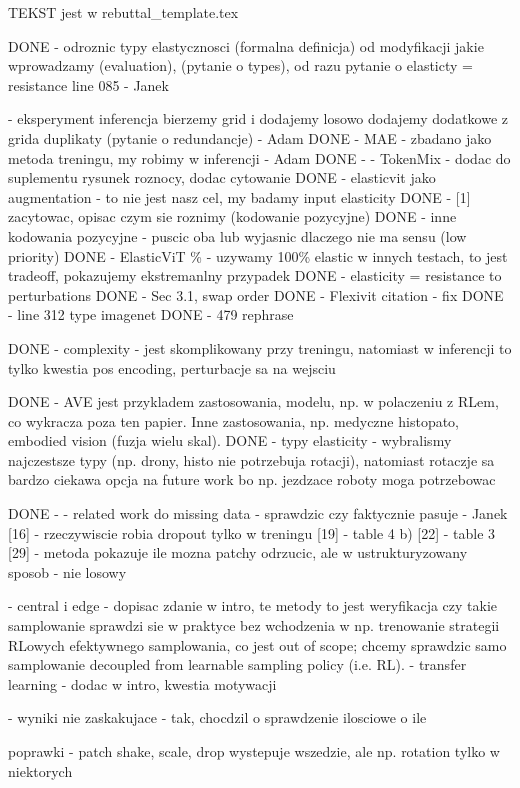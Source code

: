 TEKST jest w rebuttal\_template.tex


DONE - odroznic typy elastycznosci (formalna definicja) od modyfikacji jakie wprowadzamy (evaluation), (pytanie o types), od razu pytanie o elasticty = resistance line 085 - Janek




- eksperyment inferencja bierzemy grid i dodajemy losowo dodajemy dodatkowe z grida duplikaty (pytanie o redundancje) - Adam
DONE - MAE - zbadano jako metoda treningu, my robimy w inferencji - Adam
DONE - - TokenMix - dodac do suplementu rysunek roznocy, dodac cytowanie
DONE - elasticvit jako augmentation - to nie jest nasz cel, my badamy input elasticity
DONE - [1] zacytowac, opisac czym sie roznimy (kodowanie pozycyjne)
DONE - inne kodowania pozycyjne - puscic oba lub wyjasnic dlaczego nie ma sensu (low priority)
DONE - ElasticViT \% - uzywamy 100\% elastic w innych testach, to jest tradeoff, pokazujemy ekstremanlny przypadek
DONE - elasticity = resistance to perturbations
DONE - Sec 3.1, swap order
DONE - Flexivit citation - fix
DONE - line 312 type imagenet
DONE - 479 rephrase



DONE - complexity - jest skomplikowany przy treningu, natomiast w inferencji to tylko kwestia pos encoding, perturbacje sa na wejsciu


DONE - AVE jest przykladem zastosowania, modelu, np. w polaczeniu z RLem, co wykracza poza ten papier. Inne zastosowania, np. medyczne histopato, embodied vision (fuzja wielu skal).
DONE - typy elasticity - wybralismy najczestsze typy (np. drony, histo nie potrzebuja rotacji), natomiast rotaczje sa bardzo ciekawa opcja na future work bo np. jezdzace roboty moga potrzebowac

DONE - - related work do missing data - sprawdzic czy faktycznie pasuje - Janek
[16] - rzeczywiscie robia dropout tylko w treningu
[19] - table 4 b)
[22] - table 3
[29] - metoda pokazuje ile mozna patchy odrzucic, ale w ustrukturyzowany sposob - nie losowy


- central i edge - dopisac zdanie w intro, te metody to jest weryfikacja czy takie samplowanie sprawdzi sie w praktyce bez wchodzenia w np. trenowanie strategii RLowych efektywnego samplowania, co jest out of scope; chcemy sprawdzic samo samplowanie decoupled from learnable sampling policy (i.e. RL).
- transfer learning - dodac w intro, kwestia motywacji


- wyniki nie zaskakujace - tak, chocdzil o sprawdzenie ilosciowe o ile



poprawki
- patch shake, scale, drop wystepuje wszedzie, ale np. rotation tylko w niektorych
